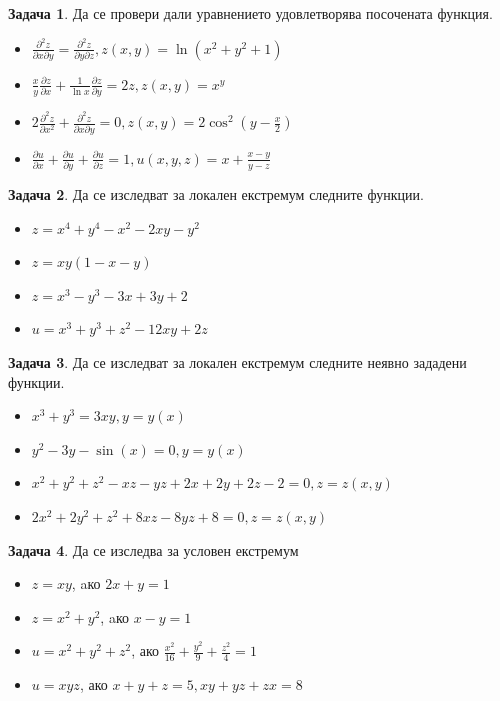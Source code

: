 \documentclass[a4paper,fleqn,12pt]{article}
\theoremstyle{definition}
\newtheorem{task}{Задача}[subsection]
\begin{document}
\begin{task}
Да се провери дали уравнението удовлетворява посочената функция.
\begin{itemize}
\item $\frac{\partial^2 z}{\partial x \partial y} = \frac{\partial^2 z}{\partial y \partial z}, z(x,y) = \ln(x^2+y^2+1)$
\item $\frac{x}{y}\frac{\partial z}{\partial x} + \frac{1}{\ln x} \frac{\partial z}{\partial y } = 2z, z(x,y) =x^y$
\item $2 \frac{\partial^2 z}{\partial x^2 } + \frac{\partial^2 z}{\partial x \partial y} = 0, z(x,y) = 2\cos^2(y - \frac{x}{2})$
\item $\frac{\partial u}{\partial x} + \frac{\partial u}{\partial y} + \frac{\partial u}{\partial z} = 1, u(x,y,z) = x + \frac{x-y}{y-z}$
\end{itemize}
\end{task}

\begin{task}
Да се изследват за локален екстремум следните функции.
\begin{itemize}
\item $z = x^4 + y^4- x^2- 2xy - y^2$
\item $z = xy(1 - x - y)$
\item $z = x^3 - y^3 - 3x + 3y + 2$
\item $u = x^3 + y^3 + z^2 - 12xy + 2z$
\end{itemize}
\end{task}

\begin{task}
Да се изследват за локален екстремум следните неявно зададени функции.
\begin{itemize}
\item $x^3 + y^3 = 3xy, y = y(x)$
\item $y^2 -3y - \sin(x)= 0, y = y(x)$
\item $x^2 + y^2 + z^2 - xz -yz + 2x + 2y + 2z - 2 = 0, z = z(x,y)$
\item $2x^2 + 2y^2 + z^2 + 8xz -8yz + 8 = 0, z = z(x,y)$
\end{itemize}
\end{task}

\begin{task}
Да се изследва за условен екстремум
\begin{itemize}
\item $z = xy$, aко $2x+y=1$
\item $z = x^2 + y^2$, aко $x - y =1$
\item $u = x^2 + y^2 + z^2$, ако $\frac{x^2}{16} + \frac{y^2}{9} + \frac{z^2}{4} = 1$
\item $u = xyz$, ако $x + y + z = 5, xy+yz+zx = 8$ 
\end{itemize}
\end{task}
\end{document}
